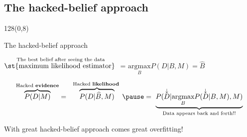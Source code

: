 \documentclass[shownotes]{beamer}
\begin{document}
\subsection{The hacked-belief approach}


\begin{frame}
 \begin{textblock}{128}(0,8)
\begin{center}
 \large The hacked-belief approach
\end{center}
\end{textblock}
\vspace{0.5cm}

\begin{center}
 \centering  $ \overset{\text{The best belief after seeing the data}}{\text{\st{maximum likelihood estimator} }}$ = $\underset{B }{\text{argmax}} P(D|B,M) = \widehat{B}$  
\end{center}

\vspace{0.6cm}
\pause

 \begin{equation*}
\overbrace{P(D|M)}^{\text{\scriptsize Hacked \textbf{evidence}}} = \ \ \overbrace{P(D|\widehat{B},M)}^{\text{\scriptsize Hacked \textbf{likelihood} }} \pause  = \  \underbrace{P(\overset{\downarrow}{D}|\underset{B}{\text{argmax}} P(\overset{\downarrow}{D}|B,M), M)}_{\text{\scriptsize Data appears back and forth!!}}
\end{equation*}


 \pause
 \vspace{0.6cm}

 \begin{mdframed}[backgroundcolor=black!15]
 \centering \large With great hacked-belief approach comes great overfitting!  
  \end{mdframed}
 

 
\end{frame}
\end{document}

